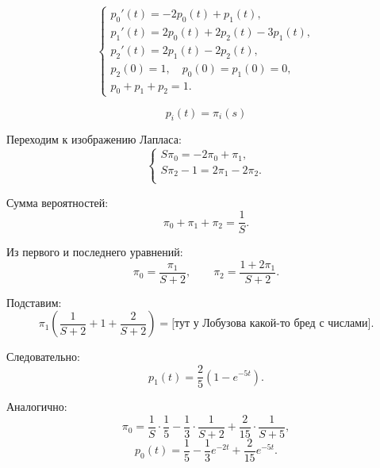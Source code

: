 \vspace{1em}

\begin{center}
\end{center}

\vspace{1em}

\[
	\begin{cases}
		p_0'(t) = -2p_0(t) + p_1(t),           \\[4pt]
		p_1'(t) = 2p_0(t) + 2p_2(t) - 3p_1(t), \\[4pt]
		p_2'(t) = 2p_1(t) - 2p_2(t),           \\[4pt]
		p_2(0) = 1,\quad p_0(0) = p_1(0) = 0,  \\[4pt]
		p_0 + p_1 + p_2 = 1.
	\end{cases}
\]

$$p_i(t)=\pi_i (s)$$

\vspace{1em}
Переходим к изображению Лапласа:
$$
	\begin{cases}
		S \pi_0  = -2 \pi_0 + \pi_1,     \\
		S \pi_2 - 1 = 2 \pi_1 - 2 \pi_2. \\
	\end{cases}
$$

Сумма вероятностей:
\[
	\pi_0 + \pi_1 + \pi_2 = \frac{1}{S}.
\]

Из первого и последнего уравнений:
\[
	\pi_0 = \frac{\pi_1}{S + 2}, \qquad
	\pi_2 = \frac{1 + 2\pi_1}{S + 2}.
\]

Подставим:
\[
	\pi_1\!\left(\frac{1}{S + 2} + 1 + \frac{2}{S + 2}\right)
	= \text{[тут у Лобузова какой-то бред с числами]}.
\]

Следовательно:
\[
	p_1(t) = \frac{2}{5}\left(1 - e^{-5t}\right).
\]

Аналогично:
\[
	\pi_0 = \frac{1}{S} \cdot \frac{1}{5} - \frac{1}{3} \cdot \frac{1}{S + 2} + \frac{2}{15} \cdot \frac{1}{S + 5},
\]
\[
	p_0(t) = \frac{1}{5} - \frac{1}{3}e^{-2t} + \frac{2}{15}e^{-5t}.
\]

